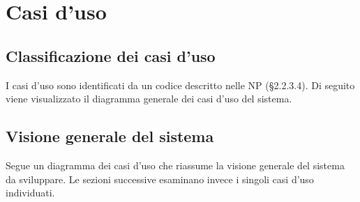 \documentclass[../AnalisideiRequisiti.tex]{subfiles}
\begin{document}

	\chapter{Casi d'uso}
	\section{Classificazione dei casi d'uso}
	I casi d'uso sono identificati da un codice descritto nelle NP (§2.2.3.4).
	Di seguito viene visualizzato il diagramma generale dei casi d'uso del sistema. 
	
	\section{Visione generale del sistema}
	Segue un diagramma dei casi d'uso che riassume la visione generale del sistema da sviluppare. Le sezioni successive esaminano invece i singoli casi d'uso individuati.
	
\end{document}
